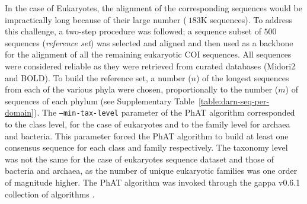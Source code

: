    In the case of Eukaryotes, the alignment of the corresponding sequences would be impractically long because of their large number ($~183$K sequences). 
   To address this challenge, a two-step procedure was followed; 
   a sequence subset of $500$ sequences (\textit{reference set}) was selected and aligned and then used as a backbone for the alignment of all the remaining eukaryotic COI sequences. 
   All sequences were considered reliable as they were retrieved from curated databases (Midori2 and BOLD). 
   To build the reference set, a number ($n$) of the longest sequences from each of the various phyla were chosen, proportionally to the number ($m$) of sequences of each phylum (see Supplementary Table~\ref{table:darn-seq-per-domain}). 
   The \texttt{--min-tax-level} parameter of the PhAT algorithm corresponded to the class level, for the case of eukaryotes and to the family level for archaea and bacteria. 
   This parameter forced the PhAT algorithm to build at least one consensus sequence for each class and family respectively. 
   The taxonomy level was not the same for the case of eukaryotes sequence dataset and those of bacteria and archaea, as the number of unique eukaryotic families was one order of magnitude higher. 
   The PhAT algorithm was invoked through the gappa v0.6.1 collection of algorithms \citep{czech2020genesis}.


